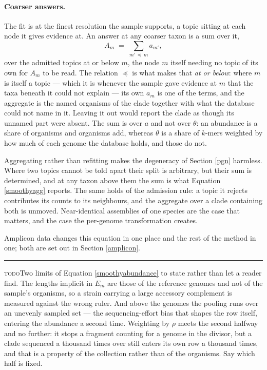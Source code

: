 \documentclass[pdflatex,sn-vancouver-num]{sn-jnl}
\newif\ifshowtodos \showtodostrue
\newcommand{\todo}[1]{%
  \ifshowtodos
    \par\addvspace{0.7\baselineskip}%
    \begin{list}{}{%
      \setlength{\leftmargin}{1.5em}%
      \setlength{\rightmargin}{1.5em}%
      \setlength{\topsep}{0pt}%
      \setlength{\partopsep}{0pt}%
      \setlength{\parsep}{0.5\baselineskip}%
      \setlength{\itemsep}{0pt}%
    }%
    \item[]\footnotesize\color{black!70}%
      \textcolor{orange!65!black}{\rule[-0.2ex]{2pt}{1.15ex}}\hspace{0.55em}%
      \textcolor{orange!65!black}{\textsc{todo}}\hspace{0.6em}\ignorespaces#1%
    \end{list}%
    \addvspace{0.7\baselineskip}%
  \fi%
}
\begin{document}
    \paragraph{Coarser answers.} The fit is at the finest resolution the sample supports, a topic
    sitting at each node it gives evidence at. An answer at any coarser taxon is a sum over it,
    \begin{equation}\label{smoothyagg}
        A_m \;=\; \sum_{m' \,\preceq\, m} a_{m'} ,
    \end{equation}
    over the admitted topics at or below $m$, the node $m$ itself needing no topic of its own for
    $A_m$ to be read. The relation $\preceq$ is what makes that
    \emph{at or below}: where $m$ is itself a topic --- which it is whenever the sample gave evidence
    at $m$ that the taxa beneath it could not explain --- its own $a_m$ is one of the terms, and the
    aggregate is the named organisms of the clade together with what the database could not name in
    it. Leaving it out would report the clade as though its unnamed part were absent. The sum is over
    $a$ and not over $\theta$: an abundance is a share of organisms and organisms add, whereas
    $\theta$ is a share of $k$-mers weighted by how much of each genome the database holds, and those
    do not.

    Aggregating rather than refitting makes the degeneracy of Section \ref{pgn} harmless.
    Where two topics cannot be told apart their split is arbitrary, but their sum is determined, and
    at any taxon above them the sum is what Equation \eqref{smoothyagg} reports. The same holds of the
    admission rule: a topic it rejects contributes its counts to its neighbours, and the aggregate
    over a clade containing both is unmoved. Near-identical assemblies of one species are the case
    that matters, and the case the per-genome transformation creates.

    Amplicon data changes this equation in one place and the rest of the method in one; both are set
    out in Section \ref{amplicon}.

    \todo{Two limits of Equation \eqref{smoothyabundance} to state rather than let a reader find. The
    lengths implicit in $E_m$ are those of the reference genomes and not of the sample's organisms, so
    a strain carrying a large accessory complement is measured against the wrong ruler. And above the
    genomes the pooling runs over an unevenly sampled set --- the sequencing-effort bias that shapes
    the row itself, entering the abundance a second time. Weighting by $\rho$ meets the second
    halfway and no further: it stops a fragment counting for a genome in the divisor, but a clade
    sequenced a thousand times over still enters its own row a thousand times, and that is a property
    of the collection rather than of the organisms. Say which half is fixed.}
\end{document}
